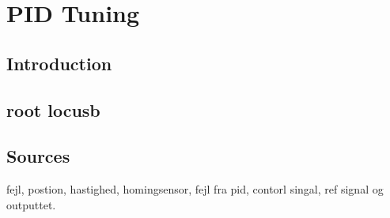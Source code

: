 \documentclass[../main]{subfiles}
\begin{document}
\section*{PID Tuning}

\subsection*{Introduction}



\subsection*{root locusb}





\subsection{Sources}

fejl, postion, hastighed, homingsensor, fejl fra pid, contorl singal, ref signal og outputtet.
\end{document}
